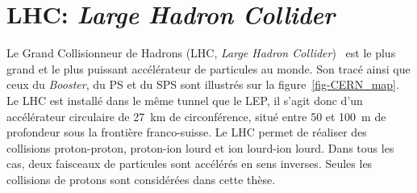 \section{LHC: \emph{Large Hadron Collider}}\label{chapter-LHC-section-LHC}
Le Grand Collisionneur de Hadrons (LHC, \emph{Large Hadron Collider})~\cite{LHC_paper1,LHC_paper2,LHC_paper3} est le plus grand et le plus puissant accélérateur de particules au monde.
Son tracé ainsi que ceux du \emph{Booster}, du PS et du SPS sont illustrés sur la figure~\ref{fig-CERN_map}.
Le LHC est installé dans le même tunnel que le LEP, il s'agit donc d'un accélérateur circulaire de \SI{27}{\kilo\meter} de circonférence, situé entre \num{50} et \SI{100}{\meter} de profondeur sous la frontière franco-suisse.
Le LHC permet de réaliser des collisions proton-proton, proton-ion lourd et ion lourd-ion lourd.
Dans tous les cas, deux faisceaux de particules sont accélérés en sens inverses.
Seules les collisions de protons sont considérées dans cette thèse.
